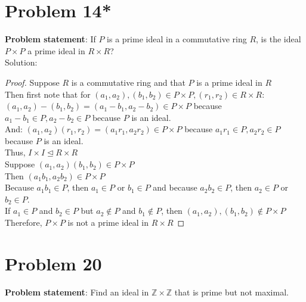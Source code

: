 \documentclass{article} %
\begin{document}
\section*{Problem 14*}


\textbf{Problem statement}: If $P$ is a prime ideal in a commutative ring $R$, is the ideal $P \times P$ a prime ideal in $R \times R$?
\\

Solution: 
\begin{addmargin}[1em]{0em}
\begin{proof}
Suppose $R$ is a commutative ring and that $P$ is a prime ideal in $R$
\\Then first note that for $(a_1,a_2),(b_1,b_2) \in P \times P, (r_1,r_2) \in R \times R$:
\\$(a_1,a_2)-(b_1,b_2) = (a_1 - b_1, a_2-b_2) \in P \times P$ because $a_1 - b_1 \in P, a_2 - b_2 \in P$ because $P$ is an ideal.
\\And: $(a_1,a_2)(r_1,r_2) = (a_1r_1, a_2r_2) \in P \times P$ because $a_1r_1 \in P, a_2r_2 \in P$ because $P$ is an ideal.
\\Thus, $I \times I \unlhd R \times R$
\\Suppose $(a_1,a_2)(b_1,b_2) \in P \times P$
\\Then $(a_1b_1, a_2b_2) \in P \times P$
\\Because $a_1b_1 \in P$, then $a_1 \in P$ or $b_1 \in P$ and because $a_2b_2 \in P$, then $a_2 \in P$ or $b_2 \in P$.
\\If $a_1 \in P$ and $b_2 \in P$ but $a_2 \not\in P$ and $b_1 \not\in P$, then $(a_1,a_2),(b_1,b_2) \not\in P \times P$
\\Therefore, $P \times P$ is not a prime ideal in $R \times R$
\end{proof}
\end{addmargin}

\newpage

\section*{Problem 20}


\textbf{Problem statement}: Find an ideal in $\mathbb{Z} \times \mathbb{Z}$ that is prime but not maximal.
\\
\end{document}
